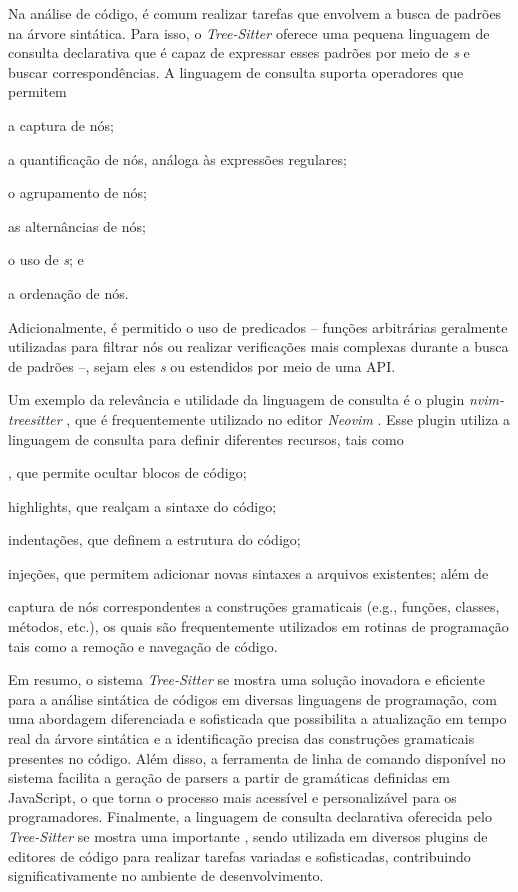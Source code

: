 \documentclass
  [11pt,a4paper,english,brazil,openright,sumario=tradicional,twoside]
  {abntex2}
\newcommand{\treesitter}{\textit{Tree-Sitter}\xspace}
\begin{document}
  Na análise de código, é comum realizar tarefas que envolvem a busca de
  padrões na árvore sintática. Para isso, o \treesitter oferece uma pequena
  linguagem de consulta declarativa que é capaz de expressar esses padrões por
  meio de \textit{s} e buscar correspondências. A linguagem
  de consulta suporta operadores que permitem
  \begin{inparaenum}
    \item a captura de nós;
    \item a quantificação de nós, análoga às expressões regulares;
    \item o agrupamento de nós;
    \item as alternâncias de nós;
    \item o uso de \textit{s}; e
    \item a ordenação de nós.
  \end{inparaenum}
  Adicionalmente, é permitido o uso de predicados -- funções arbitrárias
  geralmente utilizadas para filtrar nós ou realizar verificações mais
  complexas durante a busca de padrões --, sejam eles \textit{s}
  ou estendidos por meio de uma API.

  Um exemplo da relevância e utilidade da linguagem de consulta é o plugin
  \textit{nvim-treesitter} \cite{nvim-treesitter-2023-nvim}, que é
  frequentemente utilizado no editor \textit{Neovim}
  \cite{neovim-2023-hyperextensible}. Esse plugin utiliza a linguagem de
  consulta para definir diferentes recursos, tais como
  \begin{inparaenum}
    \item \textit{}, que permite ocultar blocos de código;
    \item highlights, que realçam a sintaxe do código;
    \item indentações, que definem a estrutura do código;
    \item injeções, que permitem adicionar novas sintaxes a arquivos
          existentes; além de
    \item captura de nós correspondentes a construções gramaticais (e.g.,
          funções, classes, métodos, etc.), os quais são frequentemente
          utilizados em rotinas de programação tais como a remoção e navegação
          de código.
  \end{inparaenum}

  Em resumo, o sistema \treesitter se mostra uma solução inovadora e eficiente
  para a análise sintática de códigos em diversas linguagens de programação,
  com uma abordagem diferenciada e sofisticada que possibilita a atualização em
  tempo real da árvore sintática e a identificação precisa das construções
  gramaticais presentes no código. Além disso, a ferramenta de linha de comando
  disponível no sistema facilita a geração de parsers a partir de gramáticas
  definidas em JavaScript, o que torna o processo mais acessível e
  personalizável para os programadores. Finalmente, a linguagem de consulta
  declarativa oferecida pelo \treesitter se mostra uma importante
  \textit{}, sendo utilizada em diversos plugins de editores de
  código para realizar tarefas variadas e sofisticadas, contribuindo
  significativamente no ambiente de desenvolvimento.
\end{document}
